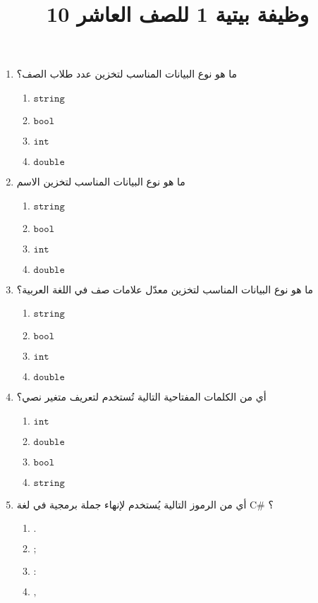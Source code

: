 \documentclass[12pt]{article}
\title{وظيفة بيتية 1 للصف العاشر 10}
\begin{document}
\maketitle
\thispagestyle{fancy}

\begin{enumerate}

    \item ما هو نوع البيانات المناسب لتخزين عدد طلاب الصف؟
    \begin{enumerate}
        \item $\mathtt{string}$
        \item $\mathtt{bool}$
        \item $\mathtt{int}$
        \item $\mathtt{double}$
    \end{enumerate}

    \item ما هو نوع البيانات المناسب لتخزين الاسم
    \begin{enumerate}
        \item $\mathtt{string}$
        \item $\mathtt{bool}$
        \item $\mathtt{int}$
        \item $\mathtt{double}$
    \end{enumerate}

    \item ما هو نوع البيانات المناسب لتخزين معدّل علامات صف في اللغة العربية؟
    \begin{enumerate}
        \item $\mathtt{string}$
        \item $\mathtt{bool}$
        \item $\mathtt{int}$
        \item $\mathtt{double}$
    \end{enumerate}

    \item أي من الكلمات المفتاحية التالية تُستخدم لتعريف متغير نصي؟
    \begin{enumerate}
        \item $\mathtt{int}$
        \item $\mathtt{double}$
        \item $\mathtt{bool}$
        \item $\mathtt{string}$
    \end{enumerate}

    \item أي من الرموز التالية يُستخدم لإنهاء جملة برمجية في لغة C\# ؟
    \begin{enumerate}
        \item $\mathtt{.}$
        \item $\mathtt{;}$
        \item $\mathtt{:}$
        \item $\mathtt{,}$
    \end{enumerate}


\end{enumerate}
\end{document}
